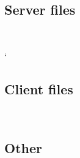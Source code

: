 \documentclass{article}
\begin{document}
\subsection{Server files}~
	
	`
	
\subsection{Client files}~
	
	
	
\subsection{Other}~
	
\end{document}
